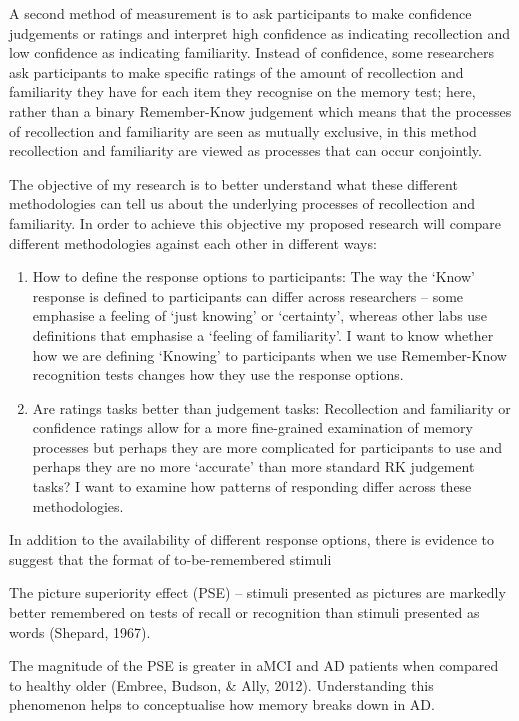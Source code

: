 \documentclass[
  11pt,
]{article}
\providecommand{\tightlist}{%
  \setlength{\itemsep}{0pt}\setlength{\parskip}{0pt}}
\begin{document}
A second method of measurement is to ask participants to make confidence
judgements or ratings and interpret high confidence as indicating
recollection and low confidence as indicating familiarity. Instead of
confidence, some researchers ask participants to make specific ratings
of the amount of recollection and familiarity they have for each item
they recognise on the memory test; here, rather than a binary
Remember-Know judgement which means that the processes of recollection
and familiarity are seen as mutually exclusive, in this method
recollection and familiarity are viewed as processes that can occur
conjointly.

The objective of my research is to better understand what these
different methodologies can tell us about the underlying processes of
recollection and familiarity. In order to achieve this objective my
proposed research will compare different methodologies against each
other in different ways:

\begin{enumerate}
\def\labelenumi{\arabic{enumi}.}
\tightlist
\item
  How to define the response options to participants: The way the `Know'
  response is defined to participants can differ across researchers --
  some emphasise a feeling of `just knowing' or `certainty', whereas
  other labs use definitions that emphasise a `feeling of familiarity'.
  I want to know whether how we are defining `Knowing' to participants
  when we use Remember-Know recognition tests changes how they use the
  response options.
\item
  Are ratings tasks better than judgement tasks: Recollection and
  familiarity or confidence ratings allow for a more fine-grained
  examination of memory processes but perhaps they are more complicated
  for participants to use and perhaps they are no more `accurate' than
  more standard RK judgement tasks? I want to examine how patterns of
  responding differ across these methodologies.
\end{enumerate}

In addition to the availability of different response options, there is
evidence to suggest that the format of to-be-remembered stimuli

The picture superiority effect (PSE) -- stimuli presented as pictures
are markedly better remembered on tests of recall or recognition than
stimuli presented as words (Shepard, 1967).

The magnitude of the PSE is greater in aMCI and AD patients when
compared to healthy older (Embree, Budson, \& Ally, 2012). Understanding
this phenomenon helps to conceptualise how memory breaks down in AD.
\end{document}

